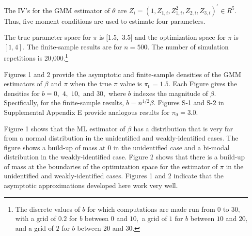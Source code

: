 \documentclass[12pt,thmsb,titlepage,final,oneside,letterpaper]{article}
\begin{document}
The IV's for the GMM estimator of $\theta $ are $%
Z_{i}=(1,Z_{1,i},Z_{1,i}^{2},Z_{2,i},Z_{3,i})^{\prime }\in R^{5}.$ Thus,
five moment conditions are used to estimate four parameters.

The true parameter space for $\pi $ is $[1.5,$ $3.5]$ and the optimization
space for $\pi $ is $[1,4].$ The finite-sample results are for $n=500.$ The
number of simulation repetitions is 20,000.\footnote{%
The discrete values of $b$ for which computations are made run from $0$ to $%
30$, with a grid of $0.2$ for $b$ between $0$ and $10,$ a grid of $1$ for $b$
between $10$ and $20$, and a grid of $2$ for $b$ between $20$ and $30.$}

Figures 1 and 2 provide the asymptotic and finite-sample densities of the
GMM estimators of $\beta $ and $\pi $ when the true $\pi $ value is $\pi
_{0}=1.5$. Each Figure gives the densities for $b=0,$ $4,$ $10,$ and $30,$
where $b$ indexes the magnitude of $\beta $. Specifically, for the
finite-sample results, $b=n^{1/2}\beta .$ Figures S-1 and S-2 in
Supplemental Appendix E provide analogous results for $\pi _{0}=3.0.$

Figure 1 shows that the ML estimator of $\beta $ has a distribution that is
very far from a normal distribution in the unidentified and
weakly-identified cases. The figure shows a build-up of mass at $0$ in the
unidentified case and a bi-modal distribution in the weakly-identified case.
Figure 2 shows that there is a build-up of mass at the boundaries of the
optimization space for the estimator of $\pi $ in the unidentified and
weakly-identified cases. Figures 1 and 2 indicate that the asymptotic
approximations developed here work very well.


\end{document}
